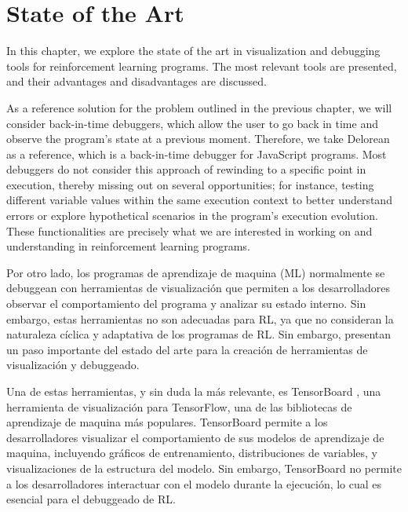 
\chapter{State of the Art}
\label{cha:state_of_the_art}

In this chapter, we explore the state of the art in visualization and debugging 
tools for reinforcement learning programs. The most relevant tools are presented, 
and their advantages and disadvantages are discussed.

As a reference solution for the problem outlined in the previous chapter, we 
will consider back-in-time debuggers, which allow the user to go back in time 
and observe the program's state at a previous moment. Therefore, we take 
Delorean \cite{delorean} as a reference, which is a back-in-time debugger for 
JavaScript programs. Most debuggers do not consider this approach of rewinding 
to a specific point in execution, thereby missing out on several opportunities; 
for instance, testing different variable values within the same execution 
context to better understand errors or explore hypothetical scenarios in the 
program's execution evolution. These functionalities are precisely what we are 
interested in working on and understanding in reinforcement learning programs.


Por otro lado, los programas de aprendizaje de maquina (ML) normalmente se debuggean
con herramientas de visualización que permiten a los desarrolladores observar
el comportamiento del programa y analizar su estado interno. Sin embargo, estas
herramientas no son adecuadas para RL, ya que no consideran la naturaleza cíclica
y adaptativa de los programas de RL. Sin embargo, presentan un paso importante del
estado del arte para la creación de herramientas de visualización y debuggeado.

Una de estas herramientas, y sin duda la más relevante, es TensorBoard 
\cite{tensorboard}, una herramienta de visualización para TensorFlow, una de las
bibliotecas de aprendizaje de maquina más populares. TensorBoard permite a los
desarrolladores visualizar el comportamiento de sus modelos de aprendizaje de
maquina, incluyendo gráficos de entrenamiento, distribuciones de variables, y
visualizaciones de la estructura del modelo. Sin embargo, TensorBoard no permite
a los desarrolladores interactuar con el modelo durante la ejecución, lo cual
es esencial para el debuggeado de RL.






\endinput

